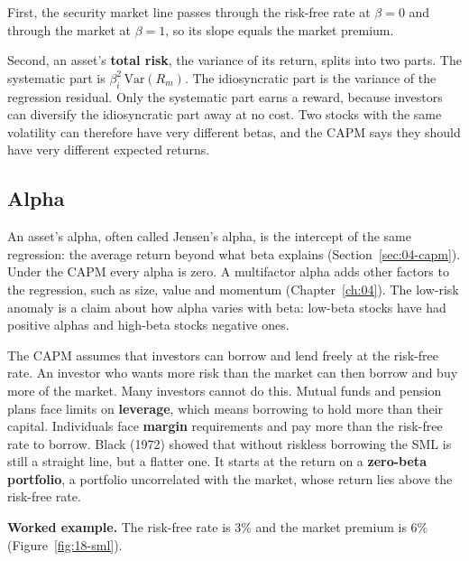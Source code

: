 First, the security market line passes through the risk-free rate at $\beta = 0$ and through the market at $\beta = 1$, so its slope equals the market premium.

Second, an asset's \textbf{total risk}, the variance of its return, splits into two parts. The systematic part is $\beta_i^2\,\mathrm{Var}(R_m)$. The idiosyncratic part is the variance of the regression residual. Only the systematic part earns a reward, because investors can diversify the idiosyncratic part away at no cost. Two stocks with the same volatility can therefore have very different betas, and the CAPM says they should have very different expected returns.

\subsection{Alpha}

An asset's alpha, often called Jensen's alpha, is the intercept of the same regression: the average return beyond what beta explains (Section~\ref{sec:04-capm}). Under the CAPM every alpha is zero. A multifactor alpha adds other factors to the regression, such as size, value and momentum (Chapter~\ref{ch:04}). The low-risk anomaly is a claim about how alpha varies with beta: low-beta stocks have had positive alphas and high-beta stocks negative ones.

The CAPM assumes that investors can borrow and lend freely at the risk-free rate. An investor who wants more risk than the market can then borrow and buy more of the market. Many investors cannot do this. Mutual funds and pension plans face limits on \textbf{leverage}, which means borrowing to hold more than their capital. Individuals face \textbf{margin} requirements and pay more than the risk-free rate to borrow. Black (1972) showed that without riskless borrowing the SML is still a straight line, but a flatter one. It starts at the return on a \textbf{zero-beta portfolio}, a portfolio uncorrelated with the market, whose return lies above the risk-free rate.

\textbf{Worked example.} The risk-free rate is 3\% and the market premium is 6\% (Figure~\ref{fig:18-sml}).

